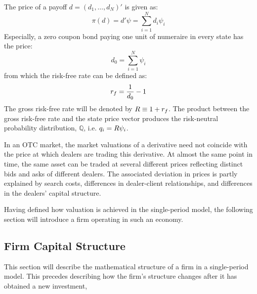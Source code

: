 \documentclass[main.tex]{subfiles}
\begin{document}
        The price of a payoff $d=\left(d_{1}, \dots, d_{N}\right)'$ is given as:
            \begin{equation}
                \pi(d) = d'\psi = \sum_{i=1}^{N} d_{i}\psi_{i}
            \end{equation}
        Especially, a zero coupon bond paying one unit of numeraire in every state has the price:
            \begin{equation}
                d_{0} = \sum_{i=1}^{N} \psi_{i}
            \end{equation}
        from which the risk-free rate can be defined as:
            \begin{equation}
                r_{f} = \frac{1}{d_{0}} - 1
            \end{equation}
        The gross risk-free rate will be denoted by $R \equiv 1 + r_{f}$.
        The product between the gross risk-free rate and the state price vector produces the risk-neutral probability distribution, $\mathbb{Q}$, i.e. $q_{i} = R\psi_{i}$.

        In an OTC market, the market valuations of a derivative need not coincide with the price at which dealers are trading this derivative.
        At almost the same point in time, the same asset can be traded at several different prices reflecting distinct bids and asks of different dealers.
        The associated deviation in prices is partly explained by search costs, differences in dealer-client relationships, and differences in the dealers' capital structure.

        Having defined how valuation is achieved in the single-period model,
        the following section will introduce a firm operating in such an economy.

    \subsection{Firm Capital Structure}
        This section will describe the mathematical structure of a firm in a single-period model.
        This precedes describing how the firm's structure changes after it has obtained a new investment,
        
\end{document}
